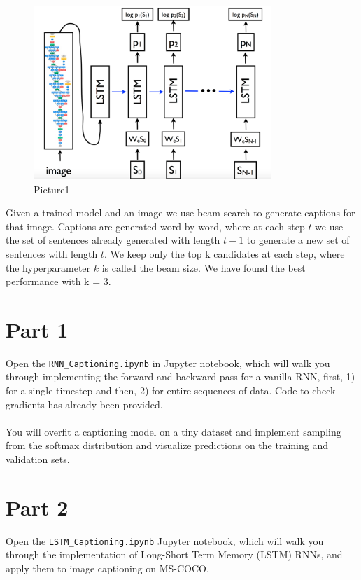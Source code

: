\documentclass[english]{article}
\begin{document}
\begin{figure}[H]
          \centering
          \includegraphics[width=0.8\textwidth]{Picture3.png}
          \caption{Picture1}
\end{figure}

Given a trained model and an image we use beam search to generate captions for that image. Captions are generated word-by-word, where at each step $t$ we use the set of sentences already generated with length $t - 1$ to generate a new set of sentences with length $t$. We keep only the top k candidates at each step, where the hyperparameter $k$ is called the beam size. We have found the best performance with k = 3.

\section{Part 1}
Open the \texttt{RNN\_Captioning.ipynb} in Jupyter notebook, which will walk you through implementing the forward and backward pass for a vanilla RNN, first, 1) for a single timestep and then, 2) for entire sequences of data. Code to check gradients has already been provided. \\\\You will overfit a captioning model on a tiny dataset and implement sampling from the softmax distribution and visualize predictions on the training and validation sets.

\section{Part 2}
Open the \texttt{LSTM\_Captioning.ipynb} Jupyter notebook, which will walk you through the implementation of Long-Short Term Memory (LSTM) RNNs, and apply them to image captioning on MS-COCO.
\end{document}
